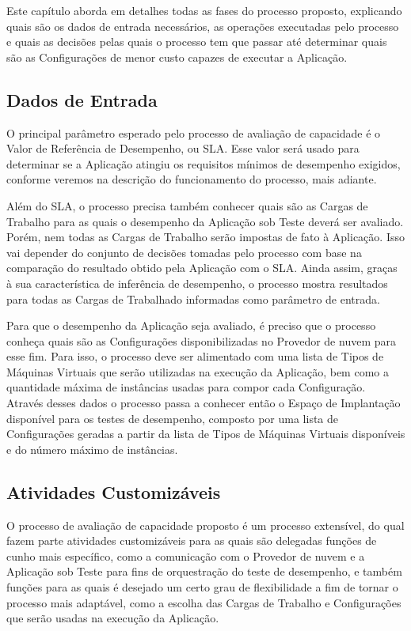 Este capítulo aborda em detalhes todas as fases do processo 
proposto, explicando quais são os dados de entrada necessários, as operações 
executadas pelo processo e quais as decisões pelas quais o processo tem que 
passar até determinar quais são as Configurações de menor custo capazes de 
executar a Aplicação.

\subsection{Dados de Entrada}

O principal parâmetro esperado pelo processo de avaliação de capacidade é o Valor
de Referência de Desempenho, ou SLA. Esse valor será usado para determinar 
se a Aplicação atingiu os requisitos mínimos de desempenho exigidos, conforme
veremos na descrição do funcionamento do processo, mais adiante.

Além do SLA, o processo precisa também conhecer quais são as Cargas de Trabalho
para as quais o desempenho da Aplicação sob Teste deverá ser avaliado. Porém,
nem todas as Cargas de Trabalho serão impostas de fato à Aplicação. Isso vai 
depender do conjunto de decisões tomadas pelo processo com base na comparação do 
resultado obtido pela Aplicação com o SLA. Ainda assim, graças à sua característica 
de inferência de desempenho, o processo mostra resultados para todas as Cargas de 
Trabalhado informadas como parâmetro de entrada.

Para que o desempenho da Aplicação seja avaliado, é preciso que o processo conheça 
quais são as Configurações disponibilizadas no Provedor de nuvem para esse fim. 
Para isso, o processo deve ser alimentado com uma lista de Tipos de Máquinas Virtuais 
que serão utilizadas na execução da Aplicação, bem como a quantidade máxima de 
instâncias usadas para compor cada Configuração. Através desses dados o processo
passa a conhecer então o Espaço de Implantação disponível para os testes de 
desempenho, composto por uma lista de Configurações geradas a partir da lista de
Tipos de Máquinas Virtuais disponíveis e do número máximo de instâncias.

\subsection{Atividades Customizáveis}
O processo de avaliação de capacidade proposto é um processo extensível, do qual
fazem parte atividades customizáveis para as quais são delegadas funções de
cunho mais específico, como a comunicação com o Provedor de nuvem e a Aplicação sob Teste
para fins de orquestração do teste de desempenho, e também funções para as quais
é desejado um certo grau de flexibilidade a fim de tornar o processo mais adaptável,
como a escolha das Cargas de Trabalho e Configurações que serão usadas na execução
da Aplicação.

